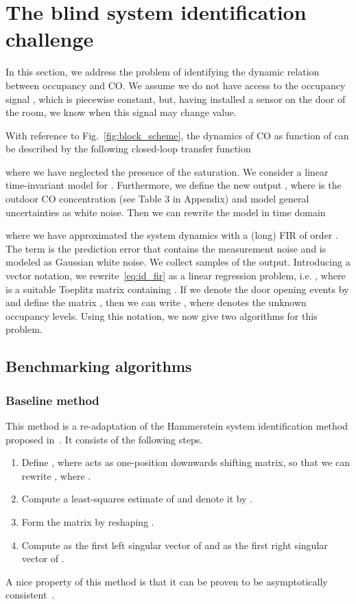 \documentclass{article}
\begin{document}
\section{The blind system identification challenge}\label{sec:blind_id}
In this section, we address the problem of identifying the dynamic relation between occupancy and CO. We assume we do not have access to the occupancy signal , which is piecewise constant, but, having installed a sensor on the door of the room, we know when this signal may change value.

With reference to Fig.~\ref{fig:block_scheme}, the dynamics of CO as function of  can be described by the following closed-loop transfer function

where we have neglected the presence of the saturation. We consider a linear time-invariant model for . Furthermore, we define the new output , where  is the outdoor CO concentration (see Table 3 in Appendix) and model general uncertainties as white noise. Then we can rewrite the model in time domain

where we have approximated the system dynamics with a (long) FIR of order .
The term  is the prediction error that contains the
measurement noise and is modeled as Gaussian white noise.
We collect  samples of the output. Introducing a vector notation, we rewrite~\eqref{eq:id_fir} as a linear regression problem, i.e.
, where  is a suitable Toeplitz matrix
containing .
If we denote the door opening events by  and define the matrix , then we can write
, where  denotes the unknown occupancy levels. Using this notation, we now give two algorithms for this problem.
\subsection{Benchmarking algorithms}
\subsubsection{Baseline method}
This method is a re-adaptation of the Hammerstein system identification method
proposed in~\cite{bai1998optimal}. It consists of the following steps.
\begin{enumerate}
\item Define , where   acts as one-position downwards shifting matrix, so that we can rewrite , where .
\item Compute a least-squares estimate of  and denote it by .
\item Form the  matrix  by reshaping .
\item Compute  as the first left singular vector of  and  as the first right singular vector of .
\end{enumerate}
A nice property of this method is that it can be proven to be asymptotically
consistent~\cite{bai1998optimal}.
\end{document}
